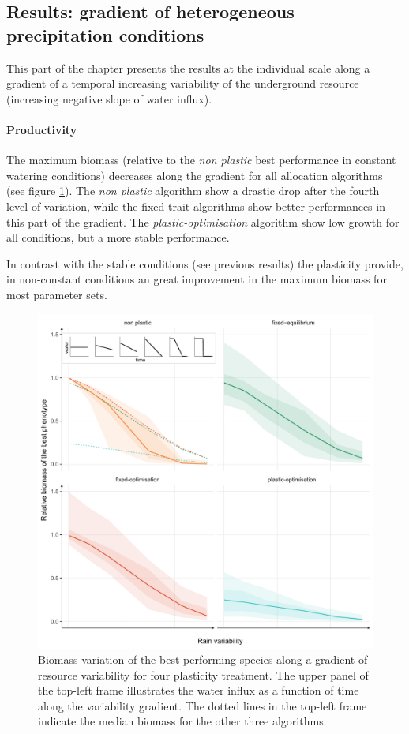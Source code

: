 \subsection{Results: gradient of heterogeneous precipitation conditions}

This part of the chapter presents the results at the individual scale along a gradient of a temporal increasing variability of the underground resource (increasing negative slope of water influx).

\paragraph{Productivity}
The maximum biomass (relative to the \textit{non plastic} best performance in constant watering conditions) decreases along the gradient for all allocation algorithms (see figure \ref{fig:variable_BM}). The \textit{non plastic} algorithm show a drastic drop after the fourth level of variation, while the fixed-trait algorithms show better performances in this part of the gradient. The \textit{plastic-optimisation} algorithm show low growth for all conditions, but a more stable performance.

In contrast with the stable conditions (see previous results) the plasticity provide, in non-constant conditions an great improvement in the maximum biomass for most parameter sets. 

\begin{figure}\label{fig:variable_BM}
\includegraphics[width = \textwidth]{./2_PP/Figures/Variable/var_relnone_BM_trend.pdf}
\caption[Biomass variations along a gradient of resource variability]{Biomass variation of the best performing species along a gradient of resource variability for four plasticity treatment. The upper panel of the top-left frame illustrates the water influx as a function of time along the variability gradient. The dotted lines in the top-left frame indicate the median biomass for the other three algorithms. }
\end{figure}

